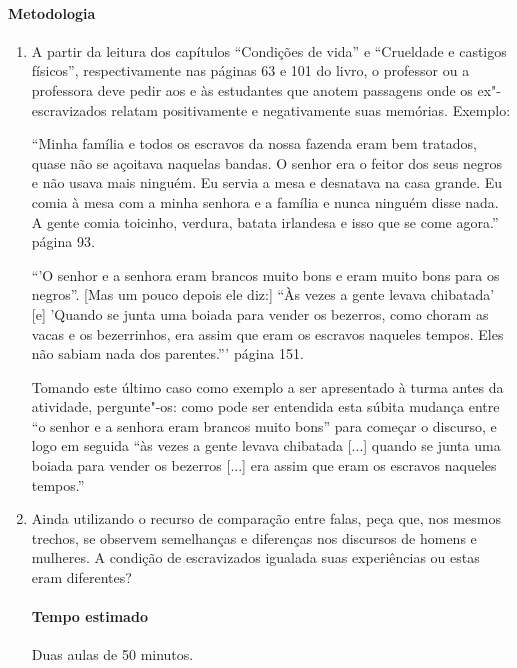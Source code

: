\documentclass[11pt]{extarticle}
\begin{document}
\begin{enumerate}

\paragraph{Metodologia}

\begin{enumerate}

  \item A partir da leitura dos capítulos ``Condições de vida'' e ``Crueldade e castigos
  físicos'', respectivamente nas páginas 63 e 101 do livro, o professor ou a professora deve 
  pedir aos e às estudantes que anotem passagens onde os ex"-escravizados relatam
  positivamente e negativamente suas memórias. Exemplo:

  ``Minha família e todos os escravos da nossa fazenda eram
bem tratados, quase não se açoitava naquelas bandas. O
senhor era o feitor dos seus negros e não usava mais
ninguém. Eu servia a mesa e desnatava na casa grande.
Eu comia à mesa com a minha senhora e a família
e nunca ninguém disse nada. A gente comia toicinho,
verdura, batata irlandesa e isso que se come agora.'' página 93.

``'O senhor e a senhora
eram brancos muito bons e eram muito bons para os negros”. [Mas um pouco depois ele diz:] “Às vezes a gente
levava chibatada' [e] 'Quando se junta uma boiada para
vender os bezerros, como choram as vacas e os bezerrinhos, era assim que eram os escravos naqueles tempos.
Eles não sabiam nada dos parentes.''' página 151.

  Tomando este último caso como exemplo a ser apresentado à turma antes da atividade,
  pergunte"-os: como pode ser entendida esta súbita mudança entre ``o senhor
  e a senhora eram brancos muito bons'' para começar o discurso,
  e logo em seguida ``às vezes a gente levava chibatada [...] quando se junta uma boiada para
vender os bezerros [...] era assim que eram os escravos naqueles tempos.''

  \item
  Ainda utilizando o recurso de comparação entre falas, peça que,
  nos mesmos trechos, se observem semelhanças e diferenças
  nos discursos de homens e mulheres. A condição de escravizados
  igualada suas experiências ou estas eram diferentes?

  \paragraph{Tempo estimado} Duas aulas de 50 minutos.


\end{enumerate}
\end{enumerate}
\end{document}

